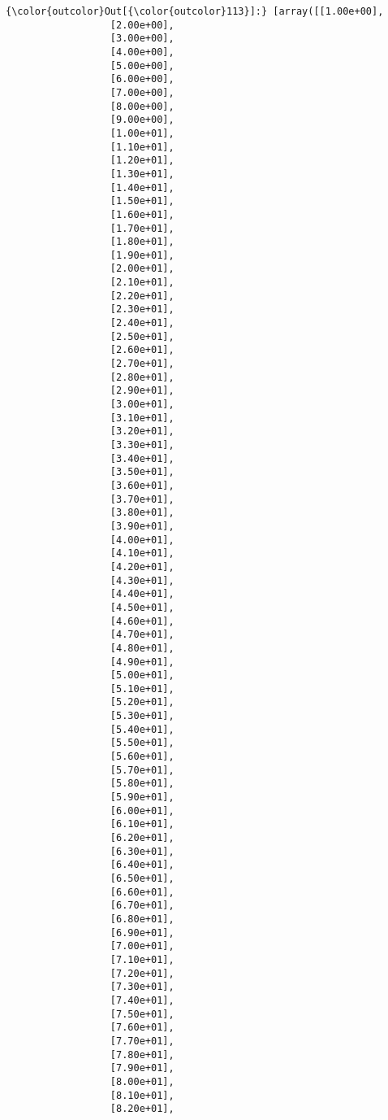 \documentclass[11pt]{article}
\begin{document}
\begin{Verbatim}[commandchars=\\\{\}]
{\color{outcolor}Out[{\color{outcolor}113}]:} [array([[1.00e+00],
                  [2.00e+00],
                  [3.00e+00],
                  [4.00e+00],
                  [5.00e+00],
                  [6.00e+00],
                  [7.00e+00],
                  [8.00e+00],
                  [9.00e+00],
                  [1.00e+01],
                  [1.10e+01],
                  [1.20e+01],
                  [1.30e+01],
                  [1.40e+01],
                  [1.50e+01],
                  [1.60e+01],
                  [1.70e+01],
                  [1.80e+01],
                  [1.90e+01],
                  [2.00e+01],
                  [2.10e+01],
                  [2.20e+01],
                  [2.30e+01],
                  [2.40e+01],
                  [2.50e+01],
                  [2.60e+01],
                  [2.70e+01],
                  [2.80e+01],
                  [2.90e+01],
                  [3.00e+01],
                  [3.10e+01],
                  [3.20e+01],
                  [3.30e+01],
                  [3.40e+01],
                  [3.50e+01],
                  [3.60e+01],
                  [3.70e+01],
                  [3.80e+01],
                  [3.90e+01],
                  [4.00e+01],
                  [4.10e+01],
                  [4.20e+01],
                  [4.30e+01],
                  [4.40e+01],
                  [4.50e+01],
                  [4.60e+01],
                  [4.70e+01],
                  [4.80e+01],
                  [4.90e+01],
                  [5.00e+01],
                  [5.10e+01],
                  [5.20e+01],
                  [5.30e+01],
                  [5.40e+01],
                  [5.50e+01],
                  [5.60e+01],
                  [5.70e+01],
                  [5.80e+01],
                  [5.90e+01],
                  [6.00e+01],
                  [6.10e+01],
                  [6.20e+01],
                  [6.30e+01],
                  [6.40e+01],
                  [6.50e+01],
                  [6.60e+01],
                  [6.70e+01],
                  [6.80e+01],
                  [6.90e+01],
                  [7.00e+01],
                  [7.10e+01],
                  [7.20e+01],
                  [7.30e+01],
                  [7.40e+01],
                  [7.50e+01],
                  [7.60e+01],
                  [7.70e+01],
                  [7.80e+01],
                  [7.90e+01],
                  [8.00e+01],
                  [8.10e+01],
                  [8.20e+01],

\end{Verbatim}
\end{document}
